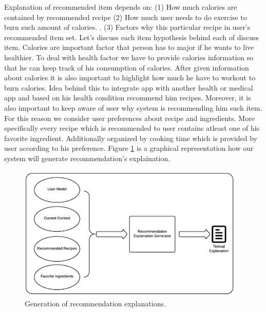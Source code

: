 Explanation of recommended item depends on: (1) How much calories are contained by recommended recipe (2) How much user needs to do exercise to burn such amount of calories. . (3) Factors why this particular recipe in user’s recommended item set. Let’s discuss each item hypothesis behind each of discuss item. Calories are important factor that person has to major if he wants to live healthier. To deal with health factor we have to provide calories information so that he can keep track of his consumption of calories. After given information about calories it is also important to highlight how much he have to workout to burn calories. Idea behind this to integrate app with another health or medical app and based on his health condition recommend him recipes. Moreover, it is also important to keep aware of user why system is recommending him such item. For this reason we consider user preferences about recipe and ingredients. More specifically every recipe which is recommended to user contains atleast one of his favorite ingredient. Additionally organized by cooking time which is provided by user according to his preference. Figure \ref{fig:ch3_explanation_generator} is a graphical representation how our system will generate recommendation’s explaination.

  \begin{figure}[h]
  	\centering
  	\includegraphics[width=.8\linewidth]{figures/ch3_explanation_generator.png}
  	\caption{Generation of recommendation explanations.}
  	\label{fig:ch3_explanation_generator}
  \end{figure}
